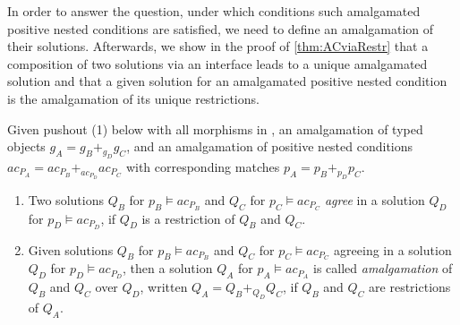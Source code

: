 In order to answer the question, under which conditions such amalgamated positive nested conditions are satisfied, we need to define an amalgamation of their solutions. Afterwards, we show in the proof of \autoref{thm:ACviaRestr} that a composition of two solutions via an interface leads to a unique amalgamated solution and that a given solution for an amalgamated positive nested condition is the amalgamation of its unique restrictions.

\begin{definition}\label{def:agreement-amalgamation-solution}
	Given pushout (1) below with all morphisms in \M, an amalgamation of typed objects $g_A = g_B +_{g_D} g_C$,
	and an amalgamation of positive nested conditions $ac_{P_A} = ac_{P_B} +_{ac_{P_D}} ac_{P_C}$ 
	with corresponding matches $p_A = p_B +_{p_D} p_C$.
	\begin{enumerate}
		\item Two solutions $Q_B$ for $p_B \vDash ac_{P_B}$ and $Q_C$ for $p_C \vDash ac_{P_C}$ \emph{agree} in a solution $Q_D$ for $p_D \vDash ac_{P_D}$,
			if $Q_D$ is a restriction of $Q_B$ and $Q_C$.
		
		\item Given solutions $Q_B$ for $p_B \vDash ac_{P_B}$ and $Q_C$ for $p_C \vDash ac_{P_C}$ agreeing in a solution $Q_D$ for $p_D \vDash ac_{P_D}$, 
			then a solution $Q_A$ for $p_A \vDash ac_{P_A}$ is called \emph{amalgamation} of
			$Q_B$ and $Q_C$ over $Q_D$, written $Q_A = Q_B +_{Q_D} Q_C$, if $Q_B$ and $Q_C$ are restrictions of $Q_A$.
	\end{enumerate}

\end{definition}

